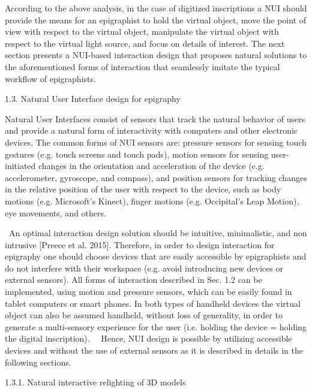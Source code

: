 \documentclass[amsthm,ebook]{saparticle}
\begin{document}
According to the above analysis, in the case of digitized inscriptions a NUI should provide the means for an epigraphist
to {\textquotedbl}hold{\textquotedbl} the virtual object, {\textquotedbl}move{\textquotedbl} the point of view with
respect to the virtual object, {\textquotedbl}manipulate{\textquotedbl} the virtual object with respect to the virtual
light source, and {\textquotedbl}focus{\textquotedbl} on details of interest. The next section presents a NUI-based
interaction design that proposes natural solutions to the aforementioned forms of interaction that seamlessly imitate
the typical workflow of epigraphists. \ \ \ 

1.3. Natural User Interface design for epigraphy

Natural User Interfaces consist of sensors that track the natural behavior of users and provide a natural form of
interactivity with computers and other electronic devices. The common forms of NUI sensors are: pressure sensors for
sensing touch gestures (e.g. touch screens and touch pads), motion sensors for sensing user-initiated changes in the
orientation and acceleration of the device (e.g. accelerometer, gyroscope, and compass), and position sensors for
tracking changes in the relative position of the user with respect to the device, such as body motions (e.g.
Microsoft's Kinect), finger motions (e.g. Occipital's Leap Motion), eye movements, and others.

\ An optimal interaction design solution should be intuitive, minimalistic, and non intrusive [Preece et al. 2015].
Therefore, in order to design interaction for epigraphy one should choose devices that are easily accessible by
epigraphists and do not interfere with their workspace (e.g. avoid introducing new devices or external sensors). All
forms of interaction described in Sec. 1.2 can be implemented, using motion and pressure sensors, which can be easily
found in tablet computers or smart phones. In both types of handheld devices the virtual object can also be assumed
handheld, without loss of generality, in order to generate a multi-sensory experience for the user (i.e. holding the
device = holding the digital inscription). \ \ Hence, NUI design is possible by utilizing accessible devices and
without the use of external sensors as it is described in details in the following sections.


\bigskip

1.3.1. Natural interactive relighting of 3D models 
\end{document}
